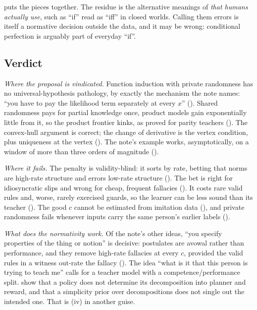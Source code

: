  puts the pieces together. The residue is the alternative meanings of  \emph{that humans actually use}, such as ``if'' read as ``iff'' in closed worlds. Calling them errors is itself a normative decision outside the data, and it may be wrong: conditional perfection is arguably part of everyday ``if''.

\subsection{Verdict}\label{sec:simplicity:verdict}

\emph{Where the proposal is vindicated.} Function induction with private randomness has no universal-hypothesis pathology, by exactly the mechanism the note names: ``you have to pay the likelihood term separately at every $x$'' (). Shared randomness pays for partial knowledge once, product models gain exponentially little from it, so the product frontier kinks, as proved for parity teachers (). The convex-hull argument is correct; the change of derivative is the vertex condition, plus uniqueness at the vertex (). The note's example works, asymptotically, on a window of more than three orders of magnitude ().

\emph{Where it fails.} The penalty is validity-blind: it sorts by rate, betting that norms are high-rate structure and errors low-rate structure (). The bet is right for idiosyncratic slips and wrong for cheap, frequent fallacies (). It costs rare valid rules and, worse, rarely exercised guards, so the learner can be less sound than its teacher (). The good $c$ cannot be estimated from imitation data (), and private randomness fails whenever inputs carry the same person's earlier labels ().

\emph{What does the normativity work.} Of the note's other ideas, ``you specify properties of the thing or notion'' is decisive: postulates are avowal rather than performance, and they remove high-rate fallacies at every $c$, provided the valid rules in a witness out-rate the fallacy (). The idea ``what is it that this person is trying to teach me'' calls for a teacher model with a competence/performance split. \citet{armstrong2018occam} show that a policy does not determine its decomposition into planner and reward, and that a simplicity prior over decompositions does not single out the intended one. That is (iv) in another guise.

